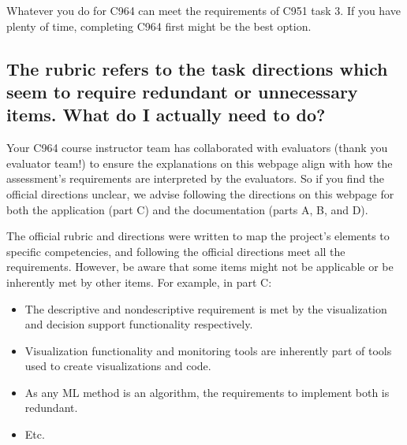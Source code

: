 \documentclass[letterpaper,10pt,english]{jupyterBook}
\begin{document}
\sphinxAtStartPar
Whatever you do for C964 can meet the requirements of C951 task 3. If you have plenty of time, completing C964 first might be the best option.


\subsection{The rubric refers to the task directions which seem to require redundant or unnecessary items. What do I actually need to do?}
\label{\detokenize{task1:the-rubric-refers-to-the-task-directions-which-seem-to-require-redundant-or-unnecessary-items-what-do-i-actually-need-to-do}}\label{\detokenize{task1:task1-faq-the-rubric-is-confusing}}
\sphinxAtStartPar
Your C964 course instructor team has collaborated with evaluators (thank you evaluator team!) to ensure the explanations on this webpage align with how the assessment’s requirements are interpreted by the evaluators. So if you find the official directions unclear, we advise following the directions on this webpage for both the application (part C) and the documentation (parts A, B, and D).

\sphinxAtStartPar
The official rubric and directions were written to map the project’s elements to specific competencies, and following the official directions  meet all the requirements. However, be aware that some items might not be applicable or be inherently met by other items. For example, in part C:
\begin{itemize}
\item {} 
\sphinxAtStartPar
The descriptive and nondescriptive requirement is met by the visualization and decision support functionality respectively.

\item {} 
\sphinxAtStartPar
Visualization functionality and monitoring tools are inherently part of tools used to create visualizations and code.

\item {} 
\sphinxAtStartPar
As any ML method is an algorithm, the requirements to implement both is redundant.

\item {} 
\sphinxAtStartPar
Etc.

\end{itemize}
\end{document}
